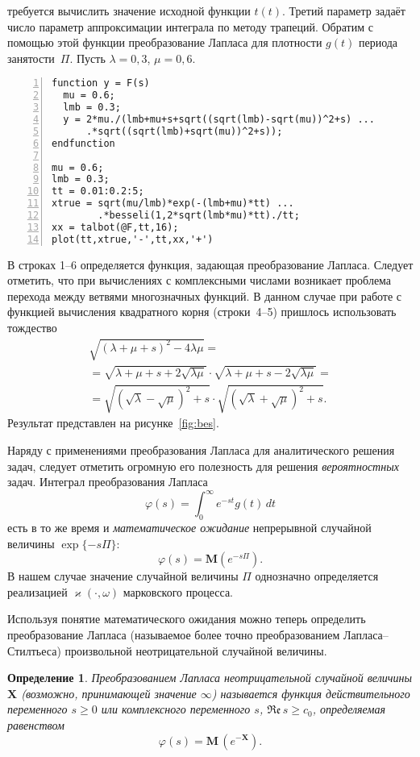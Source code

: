 \documentclass[10pt,oneside,final]{book}
\newcommand{\M}{{\mathbf M}}
\newtheorem{definition}{\color{CadetBlue}Определение}
\begin{document}
требуется вычислить значение исходной функции $t(t)$. Третий параметр задаёт
число параметр аппроксимации интеграла по методу трапеций. Обратим с помощью этой
функции преобразование Лапласа для плотности $g(t)$ периода занятости~$\Pi$. Пусть
$\lambda=0{,}3$, $\mu=0{,}6$. 
\begin{Verbatim}[frame=single,xleftmargin=2em,numbers=left]
function y = F(s)
  mu = 0.6;
  lmb = 0.3;
  y = 2*mu./(lmb+mu+s+sqrt((sqrt(lmb)-sqrt(mu))^2+s) ...
      .*sqrt((sqrt(lmb)+sqrt(mu))^2+s));
endfunction

mu = 0.6;
lmb = 0.3;
tt = 0.01:0.2:5;
xtrue = sqrt(mu/lmb)*exp(-(lmb+mu)*tt) ...
        .*besseli(1,2*sqrt(lmb*mu)*tt)./tt;
xx = talbot(@F,tt,16);
plot(tt,xtrue,'-',tt,xx,'+')
\end{Verbatim}

В строках 1--6 определяется функция, задающая преобразование Лапласа. Следует
отметить, что при вычислениях с комплексными числами возникает проблема перехода
между ветвями многозначных функций. В данном случае при работе с
функцией вычисления квадратного корня (строки~4--5) пришлось использовать
тождество
\begin{multline*}
\sqrt{(\lambda+\mu+s)^2-4\lambda\mu}=
\\ =
\sqrt{\lambda+\mu+s+2\sqrt{\lambda\mu}} \cdot
\sqrt{\lambda+\mu+s-2\sqrt{\lambda\mu}}=
\\ =
\sqrt{(\sqrt\lambda-\sqrt\mu)^2+s} \cdot
\sqrt{(\sqrt\lambda+\sqrt\mu)^2+s}.
\end{multline*}
Результат представлен на рисунке~\ref{fig:bes}.


Наряду с применениями преобразования Лапласа для аналитического решения задач,
следует отметить огромную его полезность для решения \emph{вероятностных}
задач. Интеграл преобразования Лапласа
\[
\varphi(s)=\int_0^\infty e^{-st}g(t)\,dt
\]
есть в то же время и \emph{математическое ожидание} непрерывной случайной
величины $\exp\{-s\Pi\}$:
\[
\varphi(s)=\M( e^{-s\Pi}).
\] 
В нашем случае значение случайной величины $\Pi$
однозначно определяется реализацией $\varkappa(\cdot, \omega)$ марковского
процесса. 

Используя понятие математического ожидания можно теперь определить
преобразование Лапласа (называемое более точно преобразованием
Лапласа--Стилтьеса) произвольной неотрицательной случайной величины.
\begin{definition}
  Преобразованием Лапласа неотрицательной случайной величины $\boldsymbol{X}$
  (возможно, принимающей значение $\infty$) называется функция действительного
  переменного $s\geqslant0$ или комплексного переменного $s$, 
  $\mathfrak{Re}\,s\geqslant c_0$, определяемая равенством
  \[
  \varphi(s)=\M\,(e^{-\boldsymbol{X}}).
  \]
\end{definition}
\end{document}
